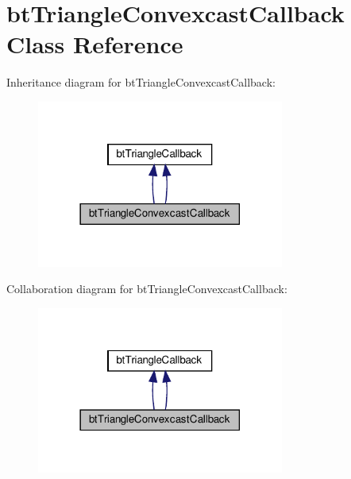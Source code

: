 \hypertarget{classbtTriangleConvexcastCallback}{}\section{bt\+Triangle\+Convexcast\+Callback Class Reference}
\label{classbtTriangleConvexcastCallback}


Inheritance diagram for bt\+Triangle\+Convexcast\+Callback\+:
\nopagebreak
\begin{figure}[H]
\begin{center}
\leavevmode
\includegraphics[width=230pt]{classbtTriangleConvexcastCallback__inherit__graph}
\end{center}
\end{figure}


Collaboration diagram for bt\+Triangle\+Convexcast\+Callback\+:
\nopagebreak
\begin{figure}[H]
\begin{center}
\leavevmode
\includegraphics[width=230pt]{classbtTriangleConvexcastCallback__coll__graph}
\end{center}
\end{figure}
